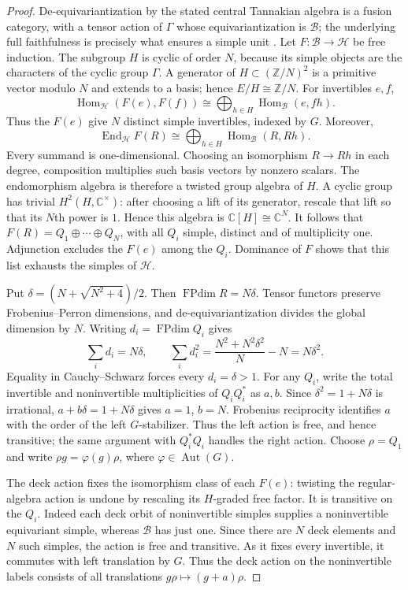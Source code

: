 \documentclass[11pt,a4paper]{article}
\numberwithin{equation}{section}
\theoremstyle{definition}\newtheorem{definition}[theorem]{Definition}
\theoremstyle{remark}\newtheorem{remark}[theorem]{Remark}
\begin{document}
\begin{proof}
De-equivariantization by the stated central Tannakian algebra is a fusion
category, with a tensor action of $\Gamma$ whose equivariantization is
$\mathcal B$; the underlying full faithfulness is precisely what ensures
a simple unit \cite[Theorem 4.18, Proposition 4.19, Remark 4.21]{dgno}.
Let $F:\mathcal B\to\mathcal H$ be free induction.
The subgroup $H$ is cyclic of order $N$, because its simple objects
are the characters of the cyclic group $\Gamma$. A generator of
$H\subset(\mathbb Z/N)^2$ is a primitive vector modulo $N$ and
extends to a basis; hence $E/H\cong\mathbb Z/N$.
For invertibles $e,f$,
\[
 \operatorname{Hom}_{\mathcal H}(F(e),F(f))
 \cong\bigoplus_{h\in H}\operatorname{Hom}_{\mathcal B}(e,fh).
\]
Thus the $F(e)$ give $N$ distinct simple invertibles, indexed by $G$.
Moreover,
\[
 \operatorname{End}_{\mathcal H}F(R)
 \cong\bigoplus_{h\in H}\operatorname{Hom}_{\mathcal B}(R,Rh).
\]
Every summand is one-dimensional. Choosing an isomorphism $R\to Rh$
in each degree, composition multiplies such basis vectors by nonzero
scalars. The endomorphism algebra is therefore a twisted group algebra
of $H$. A cyclic group has trivial $H^2(H,\mathbb C^\times)$: after
choosing a lift of its generator, rescale that lift so that its $N$th
power is $1$. Hence this algebra is $\mathbb C[H]\cong\mathbb C^N$.
It follows that $F(R)=Q_1\oplus\cdots\oplus Q_N$, with all $Q_i$
simple, distinct and of multiplicity one. Adjunction excludes the
$F(e)$ among the $Q_i$. Dominance of $F$ shows that this list exhausts
the simples of $\mathcal H$.

Put $\delta=(N+\sqrt{N^2+4})/2$. Then $\operatorname{FPdim}R=N\delta$. Tensor functors preserve Frobenius--Perron dimensions,
and de-equivariantization divides the global dimension by $N$.
Writing $d_i=\operatorname{FPdim}Q_i$ gives
\[
 \sum_i d_i=N\delta,\qquad
 \sum_i d_i^2
 =\frac{N^2+N^2\delta^2}{N}-N=N\delta^2.
\]
Equality in Cauchy--Schwarz forces every $d_i=\delta>1$.
For any $Q_i$, write the total invertible and noninvertible
multiplicities of $Q_iQ_i^*$ as $a,b$. Since
$\delta^2=1+N\delta$ is irrational,
$a+b\delta=1+N\delta$ gives $a=1$, $b=N$.
Frobenius reciprocity identifies $a$ with the order of the left
$G$-stabilizer. Thus the left action is free, and hence transitive;
the same argument with $Q_i^*Q_i$ handles the right action.
Choose $\rho=Q_1$ and write
$\rho g=\varphi(g)\rho$, where $\varphi\in\operatorname{Aut}(G)$.

The deck action fixes the isomorphism class of each $F(e)$: twisting
the regular-algebra action is undone by rescaling its $H$-graded
free factor. It is transitive on the $Q_i$. Indeed each deck orbit
of noninvertible simples supplies a noninvertible equivariant simple,
whereas $\mathcal B$ has just one. Since there are $N$ deck elements
and $N$ such simples, the action is free and transitive.
As it fixes every invertible, it commutes with left translation by
$G$. Thus the deck action on the noninvertible labels consists of
all translations $g\rho\mapsto(g+a)\rho$.


\end{proof}
\end{document}
